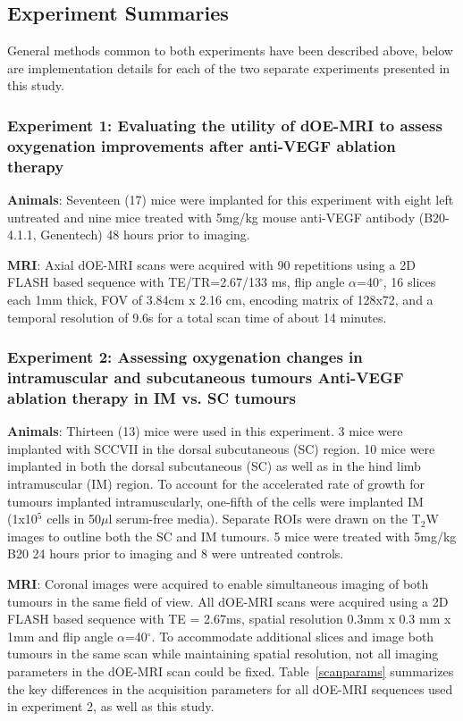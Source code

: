 \subsection{Experiment Summaries}
General methods common to both experiments have been described above, below are implementation details for each of the two separate experiments presented in this study.

\subsubsection{Experiment 1: Evaluating the utility of dOE-MRI to assess oxygenation improvements after anti-VEGF ablation therapy}
\noindent\textbf{Animals}: Seventeen (17) mice were implanted for this experiment with eight left untreated and nine mice treated with 5mg/kg mouse anti-VEGF antibody (B20-4.1.1, Genentech) 48 hours prior to imaging.

\noindent\textbf{MRI}: Axial \ac{dOE-MRI} scans were acquired with 90 repetitions using a 2D FLASH based sequence with TE/TR=2.67/133 ms, flip angle $\alpha$=40$^\circ$, 16 slices each 1mm thick, FOV of 3.84cm x 2.16 cm, encoding matrix of 128x72, and a temporal resolution of 9.6s for a total scan time of about 14 minutes.

\subsubsection{Experiment 2: Assessing oxygenation changes in intramuscular and subcutaneous tumours Anti-VEGF ablation therapy in IM vs. SC tumours}
\noindent\textbf{Animals}: Thirteen (13) mice were used in this experiment. 
3 mice were implanted with SCCVII in the dorsal subcutaneous (SC) region.
10 mice were implanted in both the dorsal subcutaneous (SC) as well as in the hind limb intramuscular (IM) region.
To account for the accelerated rate of growth for tumours implanted intramuscularly, one-fifth of the cells were implanted IM (1x10$^5$ cells in 50$\mu$l serum-free media).
Separate ROIs were drawn on the T$_2$W images to outline both the SC and IM tumours.
5 mice were treated with 5mg/kg B20 24 hours prior to imaging and 8 were untreated controls. 

\noindent\textbf{MRI}: Coronal images were acquired to enable simultaneous imaging of both tumours in the same field of view.
All \ac{dOE-MRI} scans were acquired using a 2D FLASH based sequence with TE = 2.67ms, spatial resolution 0.3mm x 0.3 mm x 1mm and flip angle $\alpha$=40$^\circ$.
To accommodate additional slices and image both tumours in the same scan while maintaining spatial resolution, not all imaging parameters in the \ac{dOE-MRI} scan could be fixed. 
Table~\ref{scanparams} summarizes the key differences in the acquisition parameters for all \ac{dOE-MRI} sequences used in experiment 2, as well as this study.


